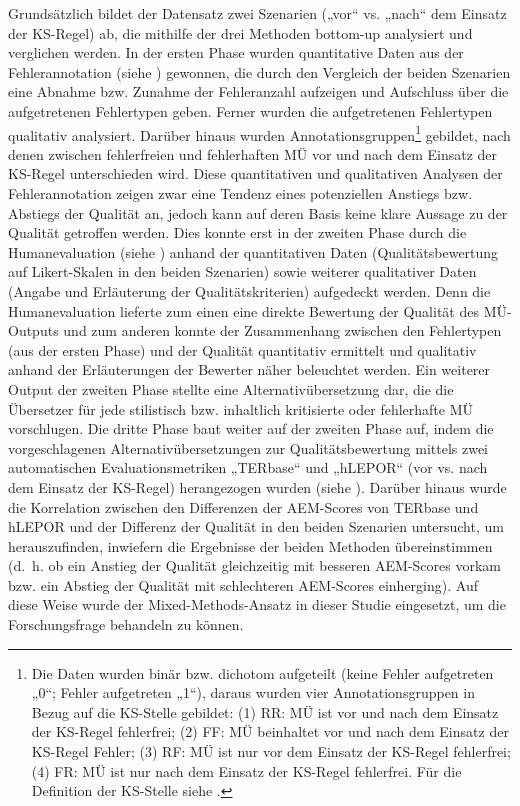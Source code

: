 Grundsätzlich bildet der Datensatz zwei Szenarien („vor“ vs. „nach“ dem Einsatz der KS-Regel) ab, die mithilfe der drei Methoden bottom-up analysiert und verglichen werden. In der ersten Phase wurden quantitative Daten aus der Fehlerannotation (siehe ) gewonnen, die durch den Vergleich der beiden Szenarien eine Abnahme bzw. Zunahme der Fehleranzahl aufzeigen und Aufschluss über die aufgetretenen Fehlertypen geben. Ferner wurden die aufgetretenen Fehlertypen qualitativ analysiert. Darüber hinaus wurden Annotationsgruppen\footnote{{Die Daten wurden binär bzw. dichotom aufgeteilt (keine Fehler aufgetreten „0“; Fehler aufgetreten „1“), daraus wurden vier Annotationsgruppen in Bezug auf die KS-Stelle gebildet: (1) RR: MÜ ist vor und nach dem Einsatz der KS-Regel fehlerfrei; (2) FF: MÜ beinhaltet vor und nach dem Einsatz der KS-Regel Fehler; (3) RF: MÜ ist nur vor dem Einsatz der KS-Regel fehlerfrei; (4) FR: MÜ ist nur nach dem Einsatz der KS-Regel fehlerfrei. Für die Definition der KS-Stelle siehe .}} gebildet, nach denen zwischen fehlerfreien und fehlerhaften MÜ vor und nach dem Einsatz der KS-Regel unterschieden wird. Diese quantitativen und qualitativen Analysen der Fehlerannotation zeigen zwar eine Tendenz eines potenziellen Anstiegs bzw. Abstiegs der Qualität an, jedoch kann auf deren Basis keine klare Aussage zu der Qualität getroffen werden. Dies konnte erst in der zweiten Phase durch die Humanevaluation (siehe ) anhand der quantitativen Daten (Qualitätsbewertung auf Likert-Skalen in den beiden Szenarien) sowie weiterer qualitativer Daten (Angabe und Erläuterung der Qualitätskriterien) aufgedeckt werden. Denn die Humanevaluation lieferte zum einen eine direkte Bewertung der Qualität des MÜ-Outputs und zum anderen konnte der Zusammenhang zwischen den Fehlertypen (aus der ersten Phase) und der Qualität quantitativ ermittelt und qualitativ anhand der Erläuterungen der Bewerter näher beleuchtet werden. Ein weiterer Output der zweiten Phase stellte eine Alternativübersetzung dar, die die Übersetzer für jede stilistisch bzw. inhaltlich kritisierte oder fehlerhafte MÜ vorschlugen. Die dritte Phase baut weiter auf der zweiten Phase auf, indem die vorgeschlagenen Alternativübersetzungen zur Qualitätsbewertung mittels zwei automatischen Evaluationsmetriken „TERbase“ und „hLEPOR“ (vor vs. nach dem Einsatz der KS-Regel) herangezogen wurden (siehe ). Darüber hinaus wurde die Korrelation zwischen den Differenzen der AEM-Scores von TERbase und hLEPOR und der Differenz der Qualität in den beiden Szenarien untersucht, um herauszufinden, inwiefern die Ergebnisse der beiden Methoden übereinstimmen (d.~h. ob ein Anstieg der Qualität gleichzeitig mit besseren AEM-Scores vorkam bzw. ein Abstieg der Qualität mit schlechteren AEM-Scores einherging). Auf diese Weise wurde der Mixed-Methods-Ansatz in dieser Studie eingesetzt, um die Forschungsfrage behandeln zu können.

